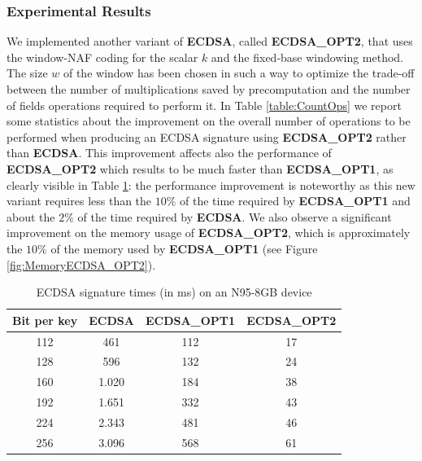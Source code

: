 \documentclass[authoryear]{elsarticle}
\begin{document}
\subsubsection{Experimental Results}
We implemented another variant of \textbf{ECDSA}, called \textbf{ECDSA\_OPT2}, that uses the window-NAF coding for the scalar $k$ and the fixed-base windowing method. The size $w$ of the window has been chosen in such a way to optimize the trade-off between the number of multiplications saved by precomputation and the number of fields operations required to perform it. In Table \ref{table:CountOps} we report some statistics about the improvement on the overall number of operations to be performed when producing an ECDSA signature using \textbf{ECDSA\_OPT2} rather than \textbf{ECDSA}. This improvement affects also the performance of \textbf{ECDSA\_OPT2} which results to be much faster than \textbf{ECDSA\_OPT1}, as clearly visible in 
Table \ref{table:BCJ2SE-BigVSJ2SEBIG_Pre}: the performance improvement is noteworthy as this new variant requires less than the $10\%$ of the time required by \textbf{ECDSA\_OPT1} and about the $2\%$ of the time required by \textbf{ECDSA}. We also observe a significant improvement on the memory usage of \textbf{ECDSA\_OPT2}, which is approximately the  $10\%$ of the memory used by \textbf{ECDSA\_OPT1}  (see Figure \ref{fig:MemoryECDSA_OPT2}).

\begin{table}[ht]
\caption{ECDSA signature times (in ms) on an N95-8GB device}
\centering %
\begin{tabular}{|c|c|c|c|} %
\hline\hline %
Bit per key & ECDSA & ECDSA\_OPT1 & ECDSA\_OPT2 \\
\hline\hline %

112  & 461 & 112 & 17  \\
128  & 596	& 132 & 24  \\
160 & 1.020 & 184 & 38 \\
192  & 1.651 & 332 & 43 \\
224  & 2.343 & 481 & 46 \\
256  & 3.096 & 568 & 61 \\ %
\hline %
\end{tabular}
\label{table:BCJ2SE-BigVSJ2SEBIG_Pre} %
\end{table}
\end{document}

